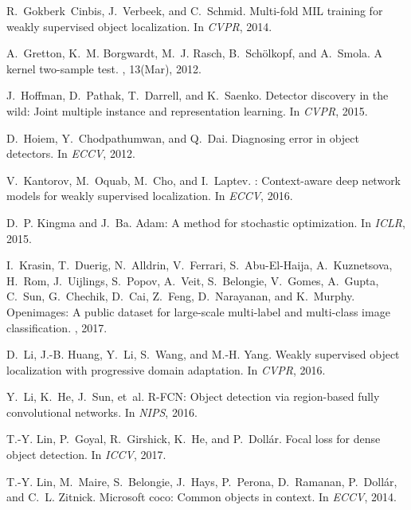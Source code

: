 \documentclass[10pt,twocolumn,letterpaper]{article}
\begin{document}
{\begin{thebibliography}{10}
R.~Gokberk~Cinbis, J.~Verbeek, and C.~Schmid.
\newblock Multi-fold {MIL} training for weakly supervised object localization.
\newblock In {\em CVPR}, 2014.

A.~Gretton, K.~M. Borgwardt, M.~J. Rasch, B.~Sch{\"o}lkopf, and A.~Smola.
\newblock A kernel two-sample test.
, 13(Mar), 2012.

J.~Hoffman, D.~Pathak, T.~Darrell, and K.~Saenko.
\newblock Detector discovery in the wild: Joint multiple instance and
  representation learning.
\newblock In {\em CVPR}, 2015.

D.~Hoiem, Y.~Chodpathumwan, and Q.~Dai.
\newblock Diagnosing error in object detectors.
\newblock In {\em ECCV}, 2012.

V.~Kantorov, M.~Oquab, M.~Cho, and I.~Laptev.
: Context-aware deep network models for weakly
  supervised localization.
\newblock In {\em ECCV}, 2016.

D.~P. Kingma and J.~Ba.
\newblock Adam: A method for stochastic optimization.
\newblock In {\em ICLR}, 2015.

I.~Krasin, T.~Duerig, N.~Alldrin, V.~Ferrari, S.~Abu-El-Haija, A.~Kuznetsova,
  H.~Rom, J.~Uijlings, S.~Popov, A.~Veit, S.~Belongie, V.~Gomes, A.~Gupta,
  C.~Sun, G.~Chechik, D.~Cai, Z.~Feng, D.~Narayanan, and K.~Murphy.
\newblock Openimages: A public dataset for large-scale multi-label and
  multi-class image classification.
, 2017.

D.~Li, J.-B. Huang, Y.~Li, S.~Wang, and M.-H. Yang.
\newblock Weakly supervised object localization with progressive domain
  adaptation.
\newblock In {\em CVPR}, 2016.

Y.~Li, K.~He, J.~Sun, et~al.
\newblock R-{FCN}: Object detection via region-based fully convolutional
  networks.
\newblock In {\em NIPS}, 2016.

T.-Y. Lin, P.~Goyal, R.~Girshick, K.~He, and P.~Doll{\'a}r.
\newblock Focal loss for dense object detection.
\newblock In {\em ICCV}, 2017.

T.-Y. Lin, M.~Maire, S.~Belongie, J.~Hays, P.~Perona, D.~Ramanan,
  P.~Doll{\'a}r, and C.~L. Zitnick.
\newblock Microsoft coco: Common objects in context.
\newblock In {\em ECCV}, 2014.


\end{thebibliography}}
\end{document}
